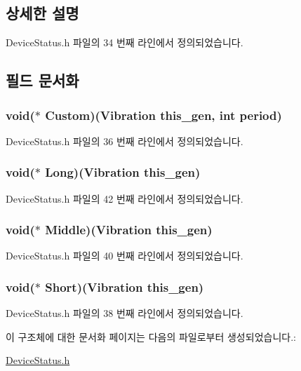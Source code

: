 \subsection{상세한 설명}


Device\-Status.\-h 파일의 34 번째 라인에서 정의되었습니다.



\subsection{필드 문서화}
\hypertarget{struct___vibration_abc4c454bcd72f75161a47f4fde1fbf55}{
\subsubsection[{Custom}]{\setlength{\rightskip}{0pt plus 5cm}void($\ast$  Custom)({\bf Vibration} this\-\_\-gen, int period)}}\label{struct___vibration_abc4c454bcd72f75161a47f4fde1fbf55}


Device\-Status.\-h 파일의 36 번째 라인에서 정의되었습니다.

\hypertarget{struct___vibration_a56bc06cfa0b7643653989b91d9524f46}{
\subsubsection[{Long}]{\setlength{\rightskip}{0pt plus 5cm}void($\ast$  Long)({\bf Vibration} this\-\_\-gen)}}\label{struct___vibration_a56bc06cfa0b7643653989b91d9524f46}


Device\-Status.\-h 파일의 42 번째 라인에서 정의되었습니다.

\hypertarget{struct___vibration_a9d7417431ae33a9f09ca9eda0bb1ec0e}{
\subsubsection[{Middle}]{\setlength{\rightskip}{0pt plus 5cm}void($\ast$  Middle)({\bf Vibration} this\-\_\-gen)}}\label{struct___vibration_a9d7417431ae33a9f09ca9eda0bb1ec0e}


Device\-Status.\-h 파일의 40 번째 라인에서 정의되었습니다.

\hypertarget{struct___vibration_adba0d5d39af26335d9e3ee022750e763}{
\subsubsection[{Short}]{\setlength{\rightskip}{0pt plus 5cm}void($\ast$  Short)({\bf Vibration} this\-\_\-gen)}}\label{struct___vibration_adba0d5d39af26335d9e3ee022750e763}


Device\-Status.\-h 파일의 38 번째 라인에서 정의되었습니다.



이 구조체에 대한 문서화 페이지는 다음의 파일로부터 생성되었습니다.\-:\begin{DoxyCompactItemize}
\item 
\hyperlink{_device_status_8h}{Device\-Status.\-h}\end{DoxyCompactItemize}
